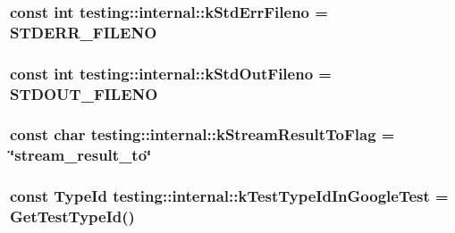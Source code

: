 \hypertarget{namespacetesting_1_1internal_a747eccfdbdee3ff8af3bedc476a57c85}{
\subsubsection[{k\-Std\-Err\-Fileno}]{\setlength{\rightskip}{0pt plus 5cm}const int testing\-::internal\-::k\-Std\-Err\-Fileno = S\-T\-D\-E\-R\-R\-\_\-\-F\-I\-L\-E\-N\-O}}\label{namespacetesting_1_1internal_a747eccfdbdee3ff8af3bedc476a57c85}
\hypertarget{namespacetesting_1_1internal_a24f0a3d50cac54a9132f4828ec9b96d9}{
\subsubsection[{k\-Std\-Out\-Fileno}]{\setlength{\rightskip}{0pt plus 5cm}const int testing\-::internal\-::k\-Std\-Out\-Fileno = S\-T\-D\-O\-U\-T\-\_\-\-F\-I\-L\-E\-N\-O}}\label{namespacetesting_1_1internal_a24f0a3d50cac54a9132f4828ec9b96d9}
\hypertarget{namespacetesting_1_1internal_aaca973772e7b80fb0e1413855d9aad8d}{
\subsubsection[{k\-Stream\-Result\-To\-Flag}]{\setlength{\rightskip}{0pt plus 5cm}const char testing\-::internal\-::k\-Stream\-Result\-To\-Flag = \char`\"{}stream\-\_\-result\-\_\-to\char`\"{}}}\label{namespacetesting_1_1internal_aaca973772e7b80fb0e1413855d9aad8d}
\hypertarget{namespacetesting_1_1internal_acac7993efabbd9dd62c1e9c7d143a72f}{
\subsubsection[{k\-Test\-Type\-Id\-In\-Google\-Test}]{\setlength{\rightskip}{0pt plus 5cm}const {\bf Type\-Id} testing\-::internal\-::k\-Test\-Type\-Id\-In\-Google\-Test = {\bf Get\-Test\-Type\-Id}()}}\label{namespacetesting_1_1internal_acac7993efabbd9dd62c1e9c7d143a72f}

